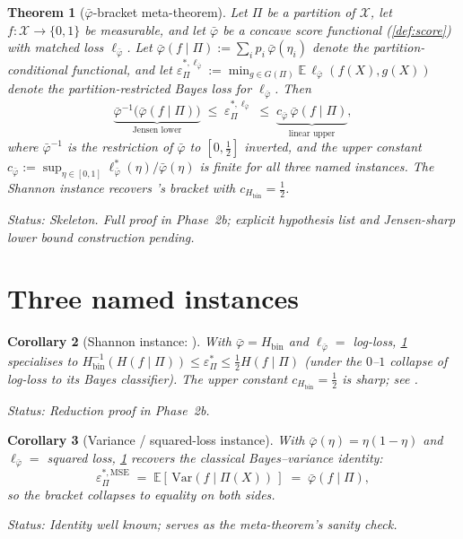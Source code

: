 \documentclass[10pt]{article}
\newtheorem{theorem}{Theorem}
\newtheorem{corollary}[theorem]{Corollary}
\theoremstyle{definition}
\theoremstyle{remark}
\newcommand{\Hbin}{H_{\mathrm{bin}}}
\newcommand{\Hinv}{H_{\mathrm{bin}}^{-1}}
\newcommand{\eps}{\varepsilon}
\newcommand{\epsP}{\eps^{\!*}_{\Pi}}
\newcommand{\epsPL}[1]{\eps^{*,#1}_{\Pi}}
\newcommand{\E}{\mathbb{E}}
\newcommand{\Var}{\mathrm{Var}}
\newcommand{\bphi}{\bar{\varphi}}        %
\newcommand{\status}[1]{\par\noindent\emph{Status:} #1}
\begin{document}
\begin{theorem}[$\bphi$-bracket meta-theorem]\label{thm:phi-bracket}
Let $\Pi$ be a partition of $\mathcal{X}$, let $f:\mathcal{X}\to
\{0,1\}$ be measurable, and let $\bphi$ be a concave score
functional (\cref{def:score}) with matched loss $\ell_{\bphi}$.
Let
$\bphi(f\mid\Pi):=\sum_i p_i\,\bphi(\eta_i)$
denote the partition-conditional functional, and let
$\epsPL{\ell_{\bphi}}:=\min_{g\in G(\Pi)}\E\,\ell_{\bphi}(f(X),g(X))$
denote the partition-restricted Bayes loss for $\ell_{\bphi}$.
Then
\[
  \underbrace{\bphi^{-1}\!\bigl(\bphi(f\mid\Pi)\bigr)}_{\text{Jensen lower}}
  \;\le\;
  \epsPL{\ell_{\bphi}}
  \;\le\;
  \underbrace{c_{\bphi}\,\bphi(f\mid\Pi)}_{\text{linear upper}},
\]
where $\bphi^{-1}$ is the restriction of $\bphi$ to
$[0,\tfrac12]$ inverted, and the upper constant
$c_{\bphi}:=\sup_{\eta\in[0,1]}
\ell_{\bphi}^{*}(\eta)/\bphi(\eta)$ is finite for all three
named instances. The Shannon instance recovers
's bracket with
$c_{\Hbin}=\tfrac12$.
\status{Skeleton. Full proof in Phase~2b; explicit hypothesis
list and Jensen-sharp lower bound construction pending.}
\end{theorem}

\section{Three named instances}\label{sec:instances}

\begin{corollary}[Shannon instance: ]
\label{cor:shannon}
With $\bphi=\Hbin$ and $\ell_{\bphi}=$ log-loss, \cref{thm:phi-bracket}
specialises to
$\Hinv(H(f\mid\Pi))\le \epsP\le \tfrac12 H(f\mid\Pi)$
(under the $0$--$1$ collapse of log-loss to its Bayes
classifier). The upper constant $c_{\Hbin}=\tfrac12$ is sharp;
see .
\status{Reduction proof in Phase~2b.}
\end{corollary}

\begin{corollary}[Variance / squared-loss instance]
\label{cor:variance}
With $\bphi(\eta)=\eta(1-\eta)$ and $\ell_{\bphi}=$ squared
loss, \cref{thm:phi-bracket} recovers the classical
Bayes--variance identity:
\[
  \epsPL{\mathrm{MSE}} \;=\; \E[\,\Var(f\mid\Pi(X))\,]
  \;=\; \bphi(f\mid\Pi),
\]
so the bracket collapses to equality on both sides.
\status{Identity well known; serves as the meta-theorem's
sanity check.}
\end{corollary}
\end{document}
